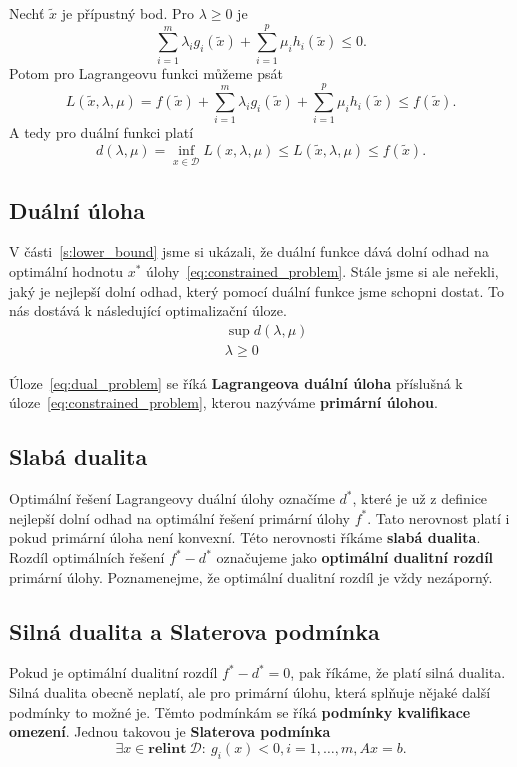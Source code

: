 Nechť $\tilde{x}$ je přípustný bod. Pro $\lambda \geq 0$ je
$$
    \sum_{i=1}^m \lambda_i g_i(\tilde{x}) + \sum_{i=1}^p \mu_i h_i(\tilde{x}) \leq 0.
$$
Potom pro Lagrangeovu funkci můžeme psát
$$
    L(\tilde{x}, \lambda, \mu) = f(\tilde{x}) + \sum_{i=1}^m \lambda_i g_i(\tilde{x}) + \sum_{i=1}^p \mu_i h_i(\tilde{x}) \leq f(\tilde{x}).
$$
A tedy pro duální funkci platí
$$
    d(\lambda, \mu) = \inf_{x \in \mathcal{D}} L(x, \lambda, \mu) \leq L(\tilde{x}, \lambda, \mu) \leq f(\tilde{x}).
$$

\subsection*{Duální úloha}

V části~\ref{s:lower_bound} jsme si ukázali, že duální funkce dává dolní odhad na optimální hodnotu $x^*$ úlohy~\ref{eq:constrained_problem}. Stále jsme si ale neřekli, jaký je nejlepší dolní odhad, který pomocí duální funkce jsme schopni dostat. To nás dostává k následující optimalizační úloze.
\begin{equation}\label{eq:dual_problem}
    \begin{split}
        &\sup d(\lambda, \mu) \\
        &\lambda \geq 0
    \end{split}
\end{equation}

Úloze~\ref{eq:dual_problem} se říká \textbf{Lagrangeova duální úloha} příslušná k úloze~\ref{eq:constrained_problem}, kterou nazýváme \textbf{primární úlohou}.

\subsection*{Slabá dualita}

Optimální řešení Lagrangeovy duální úlohy označíme $d^*$, které je už z definice nejlepší dolní odhad na optimální řešení primární úlohy $f^*$. Tato nerovnost platí i pokud primární úloha není konvexní. Této nerovnosti říkáme \textbf{slabá dualita}. Rozdíl optimálních řešení $f^* - d^*$ označujeme jako \textbf{optimální dualitní rozdíl} primární úlohy. Poznamenejme, že optimální dualitní rozdíl je vždy nezáporný.


\subsection*{Silná dualita a Slaterova podmínka}

Pokud je optimální dualitní rozdíl $f^* - d^* = 0$, pak říkáme, že platí silná dualita. Silná dualita obecně neplatí, ale pro primární úlohu, která splňuje nějaké další podmínky to možné je. Těmto podmínkám se říká \textbf{podmínky kvalifikace omezení}. Jednou takovou je \textbf{Slaterova podmínka}
$$
    \exists x \in \textbf{relint}\ \mathcal{D}:\ g_i(x) < 0, i = 1, \dots, m, Ax = b.
$$

